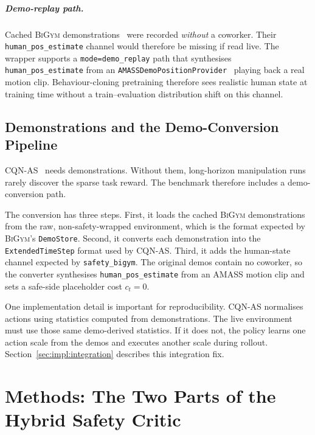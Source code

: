 \documentclass[11pt,a4paper]{report}
\newcommand{\bigym}{\textsc{BiGym}}
\newcommand{\sbigym}{\texttt{safety\_bigym}}
\newcommand{\cqnas}{CQN-AS}
\begin{document}
\paragraph{Demo-replay path.}
Cached \bigym{} demonstrations~\cite{chernyadev2024bigym} were
recorded \emph{without} a coworker. Their
\texttt{human\_pos\_estimate} channel would therefore be missing if
read live. The wrapper supports a \texttt{mode=demo\_replay} path that
synthesises \texttt{human\_pos\_estimate} from an
\texttt{AMASSDemoPositionProvider}~\cite{mahmood2019amass} playing
back a real motion clip. Behaviour-cloning pretraining therefore sees
realistic human state at training time without a train--evaluation
distribution shift on this channel.

\section{Demonstrations and the Demo-Conversion Pipeline}
\label{sec:bench:demos}

\cqnas{}~\cite{seo2024cqnas} needs demonstrations. Without them,
long-horizon manipulation runs rarely discover the sparse task reward.
The benchmark therefore includes a demo-conversion path.

The conversion has three steps. First, it loads the cached \bigym{}
demonstrations from the raw, non-safety-wrapped environment, which is
the format expected by \bigym{}'s \texttt{DemoStore}. Second, it
converts each demonstration into the \texttt{ExtendedTimeStep} format
used by \cqnas{}. Third, it adds the human-state channel expected by
\sbigym{}. The original demos contain no coworker, so the converter
synthesises \texttt{human\_pos\_estimate} from an AMASS motion clip and
sets a safe-side placeholder cost $c_t = 0$.

One implementation detail is important for reproducibility. \cqnas{}
normalises actions using statistics computed from demonstrations. The
live environment must use those same demo-derived statistics. If it
does not, the policy learns one action scale from the demos and
executes another scale during rollout. Section~\ref{sec:impl:integration}
describes this integration fix.

\chapter{Methods: The Two Parts of the Hybrid Safety Critic}
\label{ch:method}
\end{document}
